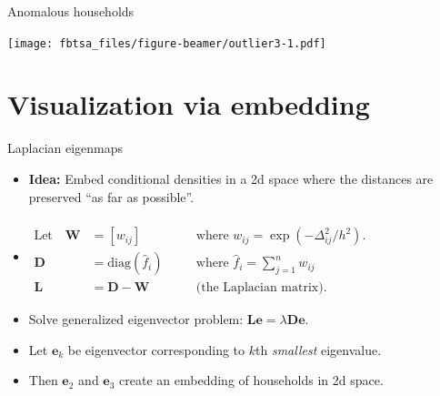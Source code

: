 \documentclass[14pt,ignorenonframetext,]{beamer}
\providecommand{\tightlist}{%
  \setlength{\itemsep}{0pt}\setlength{\parskip}{0pt}}
\begin{document}
\begin{frame}{Anomalous households}
\protect\hypertarget{anomalous-households-2}{}

\texttt{[image: fbtsa\_files/figure-beamer/outlier3-1.pdf]}

\end{frame}

\hypertarget{visualization-via-embedding}{%
\section{Visualization via
embedding}\label{visualization-via-embedding}}

\begin{frame}{Laplacian eigenmaps}
\protect\hypertarget{laplacian-eigenmaps}{}

\fontsize{13}{15}\sf

\begin{itemize}[<+->]
\tightlist
\item
  \textbf{Idea:} Embed conditional densities in a 2d space where the
  distances are preserved ``as far as possible''.
\item
  \begin{align*}
  \\[-1.36cm]
  \text{Let}\quad
  \bm{W} &=[w_{ij}] &&\text{~~ where~}w_{ij} = \exp(-\Delta_{ij}^2/h^2).\\
  \bm{D} &= \text{diag}(\hat{f}_i) &&\text{~~ where~}\hat{f}_i = \sum_{j=1}^n w_{ij}\\
  \bm{L} &=\bm{D}-\bm{W} &&\text{~~ (the Laplacian matrix).}\hspace{5cm}
  \end{align*}
\item
  Solve generalized eigenvector problem:
  \(\bm{L}\bm{e} = \lambda \bm{D}\bm{e}\).
\item
  Let \(\bm{e}_k\) be eigenvector corresponding to \(k\)th
  \emph{smallest} eigenvalue.
\item
  Then \(\bm{e}_2\) and \(\bm{e}_3\) create an embedding of households
  in 2d space.
\end{itemize}

\end{frame}
\end{document}
